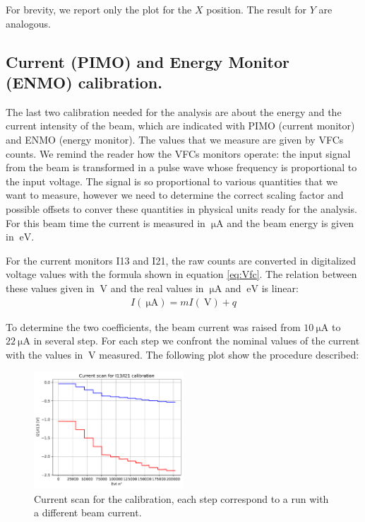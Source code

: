 For brevity, we report only the plot for the $X$ position. The result for $Y$ are analogous.
\newpage

\subsection{Current (PIMO) and Energy Monitor (ENMO) calibration.} \label{CurrentCalibration}

The last two calibration needed for the analysis are about the energy and the current intensity of the beam, which are indicated with PIMO (current monitor) and ENMO (energy monitor). 
The values that we measure are given by VFCs counts. We remind the reader how the VFCs monitors operate: the input signal from the beam is transformed in a pulse wave whose frequency is proportional to the input voltage.  The signal is so proportional to various quantities that we want to measure, however we need to determine the correct scaling factor and possible offsets to conver these quantities in physical units ready for the analysis. For this beam time the current is measured in $\SI{}{\micro \ampere}$ and the beam energy is given in $\SI{}{\electronvolt}$.\smallskip

For the current monitors I13 and I21, the raw counts are converted in digitalized voltage values with the formula shown in equation \ref{eq:Vfc}. The relation between these values given in $\SI{}{\volt}$ and the real values in $\SI{}{\micro \ampere}$ and $\SI{}{\electronvolt}$ is linear:
\begin{align*}
I(\SI{}{\micro \ampere}) = m I(\SI{}{\volt}) + q
\end{align*}

To determine the two coefficients, the beam current was raised from $\SI{10}{\micro \ampere}$ to $\SI{22}{\micro \ampere}$ in several step. For each step we confront the nominal values of the current with the values in $\SI{}{\volt}$ measured. The following plot show the procedure described:

\begin{figure}[ht]
\centering
\includegraphics[width = 0.5\textwidth]{Analysis/Calibrations/ScanI21I13.pdf}
\caption{Current scan for the calibration, each step correspond to a run with a different beam current.}
\label{fig:ScanCurrent}
\end{figure}

